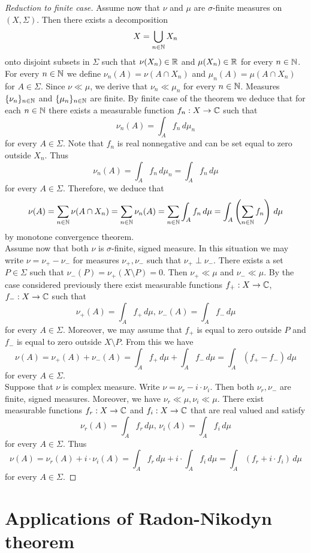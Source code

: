 \begin{proof}[Reduction to finite case]
Assume now that $\nu$ and $\mu$ are $\sigma$-finite measures on $(X,\Sigma)$. Then there exists a decomposition
$$X= \bigcup_{n\in {\mathbb N}}X_n$$
onto disjoint subsets in $\Sigma$ such that $\nu(X_n)\in {\mathbb R}$ and $\mu(X_n)\in {\mathbb R}$ for every $n\in {\mathbb N}$. For every $n\in {\mathbb N}$ we define $\nu_n(A) = \nu(A\cap X_n)$ and $\mu_n(A) = \mu(A\cap X_n)$ for $A\in \Sigma$. Since $\nu \ll \mu$, we derive that $\nu_n\ll \mu_n$ for every $n\in {\mathbb N}$. Measures $\{\nu_n\}_{n\in {\mathbb N}}$ and $\{\mu_n\}_{n\in {\mathbb N}}$ are finite. By finite case of the theorem we deduce that for each $n\in {\mathbb N}$ there exists a measurable function $f_n:X\rightarrow {\mathbb C}$ such that
$$\nu_n(A) = \int_A f_n\,d\mu_n$$
for every $A\in \Sigma$. Note that $f_n$ is real nonnegative and can be set equal to zero outside $X_n$. Thus
$$\nu_n(A) = \int_A f_n\,d\mu_n = \int_A f_n\,d\mu$$
for every $A\in \Sigma$. Therefore, we deduce that
$$\nu(A) = \sum_{n\in {\mathbb N}}\nu(A\cap X_n) = \sum_{n\in {\mathbb N}}\nu_n(A) =\sum_{n\in {\mathbb N}}\int_Af_n\,d\mu = \int_A \left(\sum_{n\in {\mathbb N}}f_n\right)\,d\mu$$
by monotone convergence theorem.\\
Assume now that both $ \nu$ is $\sigma$-finite, signed measure. In this situation we may write $\nu = \nu_+-\nu_-$ for measures $\nu_+, \nu_-$ such that $\nu_+\perp \nu_-$. There exists a set $P\in \Sigma$ such that $\nu_-(P)=\nu_+(X\setminus P)=0$. Then $\nu_+ \ll \mu$ and $\nu_-\ll \mu$. By the case considered previously there exist measurable functions $f_+:X\rightarrow {\mathbb C}$, $f_-:X\rightarrow {\mathbb C}$ such that
$$\nu_+(A) = \int_Af_+\,d\mu,\,\nu_-(A) = \int_Af_-\,d\mu$$
for every $A\in \Sigma$. Moreover, we may assume that $f_+$ is equal to zero outside $P$ and $f_-$ is equal to zero outside $X\setminus P$. From this we have
$$\nu(A) = \nu_+(A) + \nu_-(A) = \int_Af_+\,d\mu + \int_Af_-\,d\mu = \int_A\left(f_+-f_-\right)\,d\mu $$
for every $A\in \Sigma$.\\
Suppose that $\nu$ is complex measure. Write $\nu = \nu_r - i\cdot \nu_i$. Then both $\nu_r, \nu_-$ are finite, signed measures. Moreover, we have $\nu_r\ll\mu,\nu_i\ll \mu$. There exist measurable functions $f_r:X\rightarrow {\mathbb C}$ and $f_i:X\rightarrow {\mathbb C}$ that are real valued and satisfy
$$\nu_r(A) = \int_Af_r\,d\mu,\,\nu_i(A) = \int_Af_i\,d\mu$$
for every $A\in \Sigma$. Thus
$$\nu(A) = \nu_r(A) + i\cdot \nu_i(A) = \int_Af_r\,d\mu + i\cdot \int_Af_i\,d\mu = \int_A\left(f_r+i\cdot f_i\right)\,d\mu$$
for every $A\in \Sigma$.
\end{proof}

\section{Applications of Radon-Nikodyn theorem}

